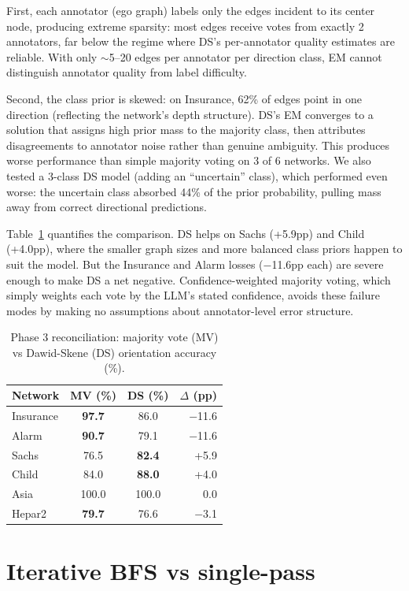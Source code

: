 \documentclass{article} %
\begin{document}
First, each annotator (ego graph) labels only the edges incident to its center node, producing extreme sparsity: most edges receive votes from exactly 2 annotators, far below the regime where DS's per-annotator quality estimates are reliable. With only $\sim$5--20 edges per annotator per direction class, EM cannot distinguish annotator quality from label difficulty.

Second, the class prior is skewed: on Insurance, 62\% of edges point in one direction (reflecting the network's depth structure). DS's EM converges to a solution that assigns high prior mass to the majority class, then attributes disagreements to annotator noise rather than genuine ambiguity. This produces worse performance than simple majority voting on 3 of 6 networks. We also tested a 3-class DS model (adding an ``uncertain'' class), which performed even worse: the uncertain class absorbed 44\% of the prior probability, pulling mass away from correct directional predictions.

Table~\ref{tab:ds} quantifies the comparison. DS helps on Sachs (+5.9pp) and Child (+4.0pp), where the smaller graph sizes and more balanced class priors happen to suit the model. But the Insurance and Alarm losses ($-$11.6pp each) are severe enough to make DS a net negative. Confidence-weighted majority voting, which simply weights each vote by the LLM's stated confidence, avoids these failure modes by making no assumptions about annotator-level error structure.

\begin{table}[h]
\centering
\caption{Phase 3 reconciliation: majority vote (MV) vs Dawid-Skene (DS) orientation accuracy (\%).}
\small
\begin{tabular}{lccr}
\toprule
Network & MV (\%) & DS (\%) & $\Delta$ (pp) \\
\midrule
Insurance & \textbf{97.7} & 86.0 & $-$11.6 \\
Alarm     & \textbf{90.7} & 79.1 & $-$11.6 \\
Sachs     & 76.5 & \textbf{82.4} & +5.9 \\
Child     & 84.0 & \textbf{88.0} & +4.0 \\
Asia      & 100.0 & 100.0 & 0.0 \\
Hepar2    & \textbf{79.7} & 76.6 & $-$3.1 \\
\bottomrule
\end{tabular}
\label{tab:ds}
\end{table}


\section{Iterative BFS vs single-pass}
\label{app:bfs}
\end{document}
